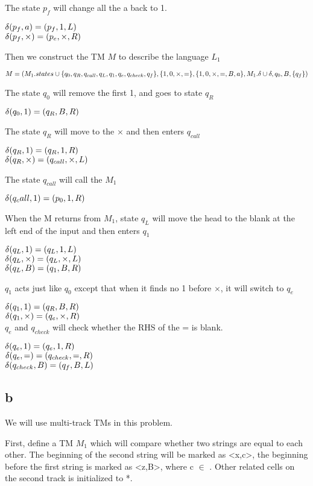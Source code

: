 \documentclass[a4paper,UTF8]{ctexart}
\theoremstyle{definition}
\begin{document}
The state $p_f$ will change all the a back to 1.

$\delta(p_f,a)=(p_f,1,L)$\\
$\delta(p_f,\times)=(p_e,\times,R)$

Then we construct the TM $M$ to describe the language $L_1$

\[M = (
  M_1.states \cup \{ q_0,q_R,q_{call},q_L,q_1,q_e,q_{check},q_f \},
  \{ 1,0,\times,= \},
  \{ 1,0,\times,=,B,a \},
  M_1.\delta \cup \delta,
  q_0,B,\{ q_f \} )\]

The state $q_0$ will remove the first 1, and goes to state $q_R$

$\delta(q_0,1)=(q_R,B,R) $

The state $q_R$ will move to the $\times$ and then enters $q_{call}$

$\delta(q_R,1)=(q_R,1,R)$\\
$\delta(q_R,\times)=(q_{call},\times,L)$

The state $q_{call}$ will call the $M_1$

$\delta(q_call,1)=(p_0,1,R)$

When the M returns from $M_1$, state $q_L$ will move the head
to the blank at the left end of the input and then enters $q_1$

$\delta(q_L,1)=(q_L,1,L)$\\
$\delta(q_L,\times)=(q_L,\times,L)$\\
$\delta(q_L,B)=(q_1,B,R)$

$q_1$ acts just like $q_0$ except that when it finds no 1 before 
$\times$, it will switch to $q_e$

$\delta(q_1,1)=(q_R,B,R)$\\
$\delta(q_1,\times)=(q_e,\times,R)$\\

$q_e$ and $q_{check}$ will check whether the RHS of the = is blank.

$\delta(q_e,1)=(q_e,1,R)$\\
$\delta(q_e,=)=(q_{check},=,R)$\\
$\delta(q_{check},B)=(q_f,B,L)$
 

\subsection*{b}

We will use multi-track TMs in this problem. 

First, define a TM $M_1$ which will compare whether two strings
are equal to each other. The beginning of the second string
will be marked as <x,c>, the beginning before the first 
string is marked as <z,B>, where c $\in$ . Other 
related cells on the second track is initialized to *.
\end{document}
